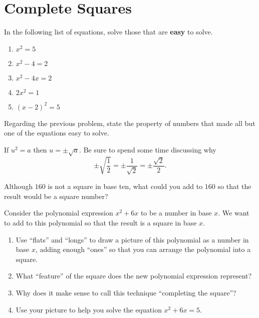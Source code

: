 \newpage
\section{Complete Squares}\label{A:completeSquares}

\begin{prob}
In the following list of equations, solve those that are \textbf{easy} to solve.  
\begin{enumerate}
\item $x^2=5$
\item $x^2 - 4 = 2$
\item $x^2 - 4x = 2$
\item $2x^2=1$
\item $(x-2)^2=5$
\end{enumerate}
\end{prob}
\vspace{0.3in}

\begin{prob}
Regarding the previous problem, state the property of numbers that made all but one of the equations easy to solve.  
\begin{teachingnote}
If $u^2=a$ then $u=\pm\sqrt{a}$.  Be sure to spend some time discussing why 
$$\pm\sqrt{\frac{1}{2}}=\pm\frac{1}{\sqrt{2}}=\pm\frac{\sqrt{2}}{2}.$$
\end{teachingnote}
\vspace{0.3in}
\end{prob}

\begin{prob}
Although $160$ is not a square in base ten, what could you add to $160$ so that the result would be a square number?  
\end{prob}

\begin{prob}
 Consider the polynomial expression $x^2+6x$ to be a number in base $x$.  We want to add to this polynomial so that the result is a square in base $x$.  
\begin{enumerate}
\item Use ``flats'' and ``longs'' to draw a picture of this polynomial as a number in base $x$, adding enough ``ones'' so that you can arrange the polynomial into a square.  
\vspace{0.5in}
\item What ``feature'' of the square does the new polynomial expression represent?  
\item Why does it make sense to call this technique ``completing the square''? 
\item Use your picture to help you solve the equation $x^2+6x=5$.  
\end{enumerate}
\end{prob}


